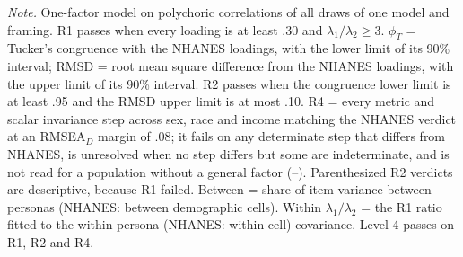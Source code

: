 \begin{table}[tp]
\begin{tabnote}
\textit{Note.} One-factor model on polychoric correlations of all draws of one model and framing. R1 passes when every loading is at least .30 and $\lambda_1/\lambda_2 \ge 3$. $\phi_T$ = Tucker's congruence with the NHANES loadings, with the lower limit of its 90\% interval; RMSD = root mean square difference from the NHANES loadings, with the upper limit of its 90\% interval. R2 passes when the congruence lower limit is at least .95 and the RMSD upper limit is at most .10. R4 = every metric and scalar invariance step across sex, race and income matching the NHANES verdict at an RMSEA$_D$ margin of .08; it fails on any determinate step that differs from NHANES, is unresolved when no step differs but some are indeterminate, and is not read for a population without a general factor (--). Parenthesized R2 verdicts are descriptive, because R1 failed. Between = share of item variance between personas (NHANES: between demographic cells). Within $\lambda_1/\lambda_2$ = the R1 ratio fitted to the within-persona (NHANES: within-cell) covariance. Level 4 passes on R1, R2 and R4.
\end{tabnote}
\end{table}

